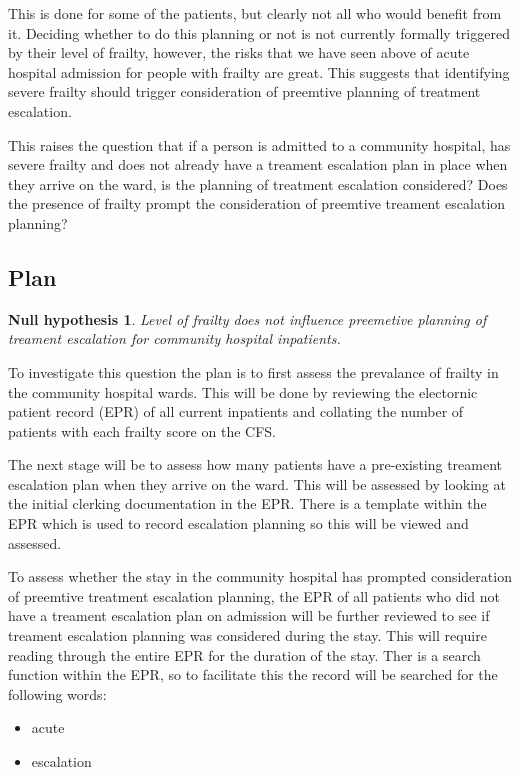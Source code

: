 \documentclass[12pt,a4paper,oneside,titlepage]{article}
\newtheorem*{nullhypothesis}{Null hypothesis}
\begin{document}
This is done for some of the patients, but clearly not all who would benefit from it. 
Deciding whether to do this planning or not is not currently formally triggered 
by their level of frailty, however, the risks that we have seen above of acute hospital 
admission for people with frailty are great. This suggests that identifying severe frailty 
should trigger consideration of preemtive planning of treatment escalation.

This raises the question that if a person is admitted to a community hospital, has 
severe frailty and does not already have a treament escalation plan in place when they 
arrive on the ward, is the planning of treatment escalation considered? Does the 
presence of frailty prompt the consideration of preemtive treament escalation planning?

\subsection*{Plan}

\begin{nullhypothesis}
Level of frailty does not influence preemetive planning of treament escalation for 
community hospital inpatients.
\end{nullhypothesis}

To investigate this question the plan is to first assess the prevalance of frailty
in the community hospital wards. This will be done by reviewing the electornic patient record (EPR)
of all current inpatients and collating the number of patients with each frailty score
on the CFS.

The next stage will be to assess how many patients have a pre-existing treament escalation plan
when they arrive on the ward. This will be assessed by looking at the initial clerking
documentation in the EPR. There is a template within the EPR which is used to record 
escalation planning so this will be viewed and assessed.

To assess whether the stay in the community hospital has prompted consideration of 
preemtive treatment escalation planning, the EPR of all patients who did not have a 
treament escalation plan on admission will be further reviewed to see if treament escalation
planning was considered during the stay. This will require reading through the entire 
EPR for the duration of the stay. Ther is a search function within the EPR, so to 
facilitate this the record will be searched for the following words:

\begin{itemize}
\item acute
\item escalation
\end{itemize}
\end{document}

